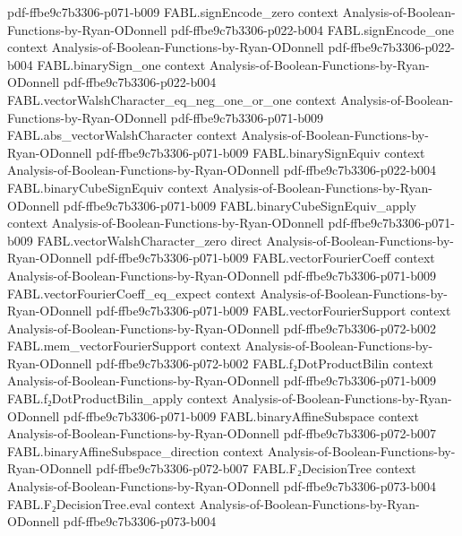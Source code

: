 \begin{theorem}
  {pdf-ffbe9c7b3306-p071-b009}
\proofstep
  {FABL.signEncode_zero}
  {context}
  {Analysis-of-Boolean-Functions-by-Ryan-ODonnell}
  {pdf-ffbe9c7b3306-p022-b004}
\proofstep
  {FABL.signEncode_one}
  {context}
  {Analysis-of-Boolean-Functions-by-Ryan-ODonnell}
  {pdf-ffbe9c7b3306-p022-b004}
\proofstep
  {FABL.binarySign_one}
  {context}
  {Analysis-of-Boolean-Functions-by-Ryan-ODonnell}
  {pdf-ffbe9c7b3306-p022-b004}
\proofstep
  {FABL.vectorWalshCharacter_eq_neg_one_or_one}
  {context}
  {Analysis-of-Boolean-Functions-by-Ryan-ODonnell}
  {pdf-ffbe9c7b3306-p071-b009}
\proofstep
  {FABL.abs_vectorWalshCharacter}
  {context}
  {Analysis-of-Boolean-Functions-by-Ryan-ODonnell}
  {pdf-ffbe9c7b3306-p071-b009}
\proofstep
  {FABL.binarySignEquiv}
  {context}
  {Analysis-of-Boolean-Functions-by-Ryan-ODonnell}
  {pdf-ffbe9c7b3306-p022-b004}
\proofstep
  {FABL.binaryCubeSignEquiv}
  {context}
  {Analysis-of-Boolean-Functions-by-Ryan-ODonnell}
  {pdf-ffbe9c7b3306-p071-b009}
\proofstep
  {FABL.binaryCubeSignEquiv_apply}
  {context}
  {Analysis-of-Boolean-Functions-by-Ryan-ODonnell}
  {pdf-ffbe9c7b3306-p071-b009}
\proofstep
  {FABL.vectorWalshCharacter_zero}
  {direct}
  {Analysis-of-Boolean-Functions-by-Ryan-ODonnell}
  {pdf-ffbe9c7b3306-p071-b009}
\proofstep
  {FABL.vectorFourierCoeff}
  {context}
  {Analysis-of-Boolean-Functions-by-Ryan-ODonnell}
  {pdf-ffbe9c7b3306-p071-b009}
\proofstep
  {FABL.vectorFourierCoeff_eq_expect}
  {context}
  {Analysis-of-Boolean-Functions-by-Ryan-ODonnell}
  {pdf-ffbe9c7b3306-p071-b009}
\proofstep
  {FABL.vectorFourierSupport}
  {context}
  {Analysis-of-Boolean-Functions-by-Ryan-ODonnell}
  {pdf-ffbe9c7b3306-p072-b002}
\proofstep
  {FABL.mem_vectorFourierSupport}
  {context}
  {Analysis-of-Boolean-Functions-by-Ryan-ODonnell}
  {pdf-ffbe9c7b3306-p072-b002}
\proofstep
  {FABL.f₂DotProductBilin}
  {context}
  {Analysis-of-Boolean-Functions-by-Ryan-ODonnell}
  {pdf-ffbe9c7b3306-p071-b009}
\proofstep
  {FABL.f₂DotProductBilin_apply}
  {context}
  {Analysis-of-Boolean-Functions-by-Ryan-ODonnell}
  {pdf-ffbe9c7b3306-p071-b009}
\proofstep
  {FABL.binaryAffineSubspace}
  {context}
  {Analysis-of-Boolean-Functions-by-Ryan-ODonnell}
  {pdf-ffbe9c7b3306-p072-b007}
\proofstep
  {FABL.binaryAffineSubspace_direction}
  {context}
  {Analysis-of-Boolean-Functions-by-Ryan-ODonnell}
  {pdf-ffbe9c7b3306-p072-b007}
\proofstep
  {FABL.F₂DecisionTree}
  {context}
  {Analysis-of-Boolean-Functions-by-Ryan-ODonnell}
  {pdf-ffbe9c7b3306-p073-b004}
\proofstep
  {FABL.F₂DecisionTree.eval}
  {context}
  {Analysis-of-Boolean-Functions-by-Ryan-ODonnell}
  {pdf-ffbe9c7b3306-p073-b004}

\end{theorem}
